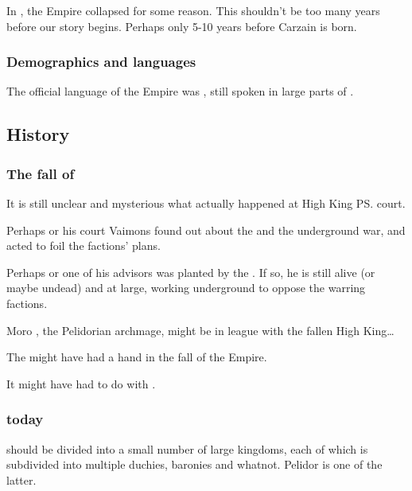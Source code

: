 In , the Empire collapsed for some reason. 
This shouldn't be too many years before our story begins. Perhaps only 5-10 years before Carzain is born. 





\subsubsection{Demographics and languages}
The official language of the Empire was \Velcadian{}, still spoken in large parts of \Velcad{}. 










\subsection{History}
\subsubsection{The fall of \theBelkadianEmpire}
It is still unclear and mysterious what actually happened at High King \ps{\LastHighKing} court. 

Perhaps \LastHighKing{} or his court Vaimons found out about the \Charade{} and the underground war, and acted to foil the factions' plans. 

Perhaps \LastHighKing{} or one of his advisors was planted by the \cuezcans{}. If so, he is still alive (or maybe undead) and at large, working underground to oppose the warring factions. 

Moro \Cornel, the Pelidorian archmage, might be in league with the fallen High King\ldots{}

The  might have had a hand in the fall of the Empire.

It might have had to do with . 





\subsubsection{\Velcad{} today}
\Velcad{} should be divided into a small number of large kingdoms, each of which is subdivided into multiple duchies, baronies and whatnot. Pelidor is one of the latter. 

